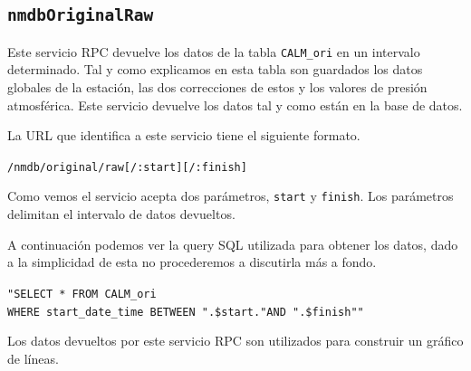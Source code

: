	\subsection{\texttt{nmdbOriginalRaw}}
		Este servicio RPC devuelve los datos de la tabla \texttt{CALM\_ori} en un intervalo determinado. Tal y como explicamos en esta tabla
		son guardados los datos globales de la estación, las dos correcciones de estos y los valores de presión atmosférica. Este servicio
		devuelve los datos tal y como están en la base de datos. 
	  	\par
		La URL que identifica a este servicio tiene el siguiente formato.
	  		\begin{center} \texttt{/nmdb/original/raw[/:start][/:finish]}  \end{center} 
		Como vemos el servicio acepta dos parámetros, \texttt{start} y \texttt{finish}. Los parámetros delimitan el intervalo de datos
		devueltos.
		\par
		A continuación podemos ver la query SQL utilizada para obtener los datos, dado a la simplicidad de esta no procederemos a discutirla
		más a fondo.
	  		\begin{center} \texttt{"SELECT * FROM CALM\_ori 
			  		\\	WHERE start\_date\_time BETWEEN \cc".\$start."\cc AND \cc".\$finish"\cc"}
			\end{center} 
		Los datos devueltos por este servicio RPC son utilizados para construir un gráfico de líneas.
